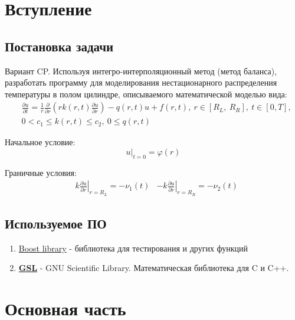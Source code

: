 \documentclass[a4paper,12pt]{article}
\begin{document}
	
	\newpage
	\tableofcontents
	\newpage

	\section{Вступление}
	\subsection{Постановка задачи}

	Вариант CP. Используя интегро-интерполяционный метод (метод баланса), разработать программу для моделирования нестационарного распределения температуры в полом цилиндре, описываемого математической моделью вида:
	\begin{align*}
		&\frac{\partial u}{\partial t} = \frac{1}{r} \frac{\partial}{\partial r}
		\left ( rk(r, t)\frac{\partial u}{\partial r} \right ) - q(r, t)u + f(r,t),
		\ r \in \left[ R_L,\ R_R\right],\ t \in [0, T],
		\\
		&0 < c_1 \leq k(r, t) \leq c_2,\ 0 \leq q(r, t)
	\end{align*}

	Начальное условие:
	\[
		\left. u \right\vert_{t=0} = \varphi(r)
	\]

	Граничные условия: \newline
	\begin{align*}
		&k \left. \frac{\partial u}{\partial r}\right\vert_{r = R_L} = -\nu_1(t)
		&-k \left. \frac{\partial u}{\partial r}\right\vert_{r = R_R} = -\nu_2(t)
	\end{align*}
	\subsection{Используемое ПО}

	\begin{enumerate}
		\item \href{https://www.boost.org/}{Boost library} - библиотека для тестирования и других функций
		\item \href{https://www.gnu.org/software/gsl/}{\textbf{GSL}} - GNU Scientific Library. Математическая библиотека для C и C++.
	\end{enumerate}
	\newpage

	\section{Основная часть}
	
	
	
	\newpage
\end{document}
